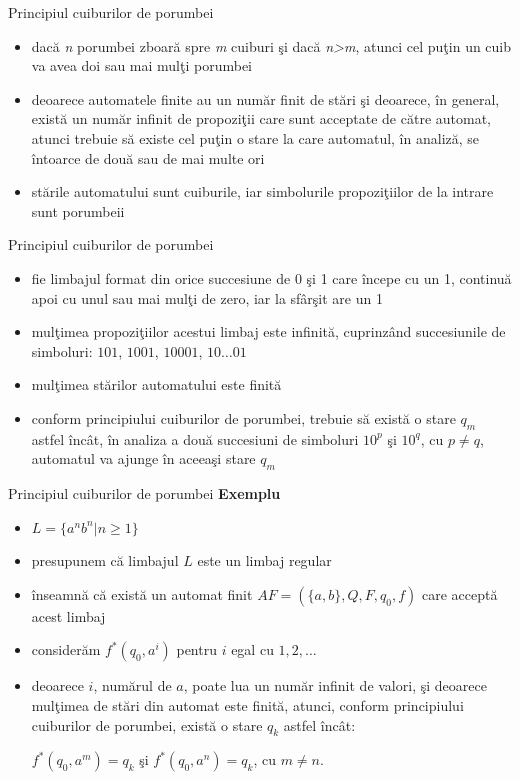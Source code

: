 \documentclass[pdf]{beamer}
\begin{document}
\begin{frame}{Principiul cuiburilor de porumbei}
\begin{itemize}
\item
dacă \textit{n} porumbei zboară spre \textit{m} cuiburi şi dacă \textit{n>m}, atunci cel puţin un cuib va avea doi sau mai mulţi porumbei
\item
deoarece automatele finite au un număr finit de stări şi deoarece, în general,  există un număr infinit de propoziţii care sunt acceptate de către automat, atunci trebuie să existe cel puţin o stare la care automatul, în analiză, se întoarce de două sau de mai multe ori
\item
stările automatului sunt cuiburile, iar simbolurile propoziţiilor de la intrare sunt porumbeii
\end{itemize}
\end{frame}



\begin{frame}{Principiul cuiburilor de porumbei}
\begin{itemize}
\item
fie limbajul format din orice succesiune de 0 şi 1 care începe cu un 1, continuă apoi cu unul sau mai mulţi de zero, iar la sfârşit are un 1
\item
mulţimea propoziţiilor acestui limbaj este infinită, cuprinzând succesiunile de simboluri: $ 101 $, $ 1001 $, $ 10001 $, $ 10\dots01 $
\item
mulţimea stărilor automatului este finită
\item
conform principiului cuiburilor de porumbei, trebuie să există o stare $ q_m $ astfel încât, în analiza a două succesiuni de simboluri $ 10^{p} $ şi $ 10^{q} $, cu $ p \neq q $, automatul va ajunge în aceeaşi stare $ q_m $
\end{itemize}
\end{frame}



\begin{frame}{Principiul cuiburilor de porumbei}
\textbf{Exemplu}
\begin{itemize}
\item
$ L = \{ a^n b^n | n \geq 1  \} $
\item
presupunem că limbajul $ L $ este un limbaj regular
\item
înseamnă că există un automat finit $AF=(\{ a, b \}, Q, F, q_{0}, f)$ care acceptă acest limbaj
\item
considerăm $ f^* (q_0, a^i) $ pentru $ i $ egal cu $ 1, 2, \dots $
\item
deoarece $ i $, numărul de $ a $, poate lua un număr infinit de valori, şi deoarece mulţimea de stări din automat este finită, atunci, conform principiului cuiburilor de porumbei, există o stare $ q_k $ astfel încât:

$ f^* (q_0, a^m) = q_k $ şi $ f^* (q_0, a^n) = q_k $, cu $ m \neq n $.
\end{itemize}
\end{frame}
\end{document}
